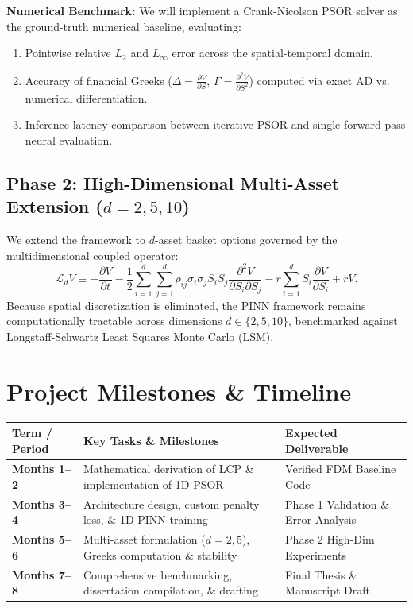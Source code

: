 ﻿\documentclass[10.5pt,a4paper]{article}
\begin{document}
\noindent \textbf{Numerical Benchmark:} We will implement a Crank-Nicolson PSOR solver as the ground-truth numerical baseline, evaluating:
\begin{enumerate}[label=(\roman*), itemsep=0.02em, topsep=0.05em]
    \item Pointwise relative $L_2$ and $L_\infty$ error across the spatial-temporal domain.
    \item Accuracy of financial Greeks ($\Delta = \frac{\partial V}{\partial S}, \, \Gamma = \frac{\partial^2 V}{\partial S^2}$) computed via exact AD vs. numerical differentiation.
    \item Inference latency comparison between iterative PSOR and single forward-pass neural evaluation.
\end{enumerate}

\subsection{Phase 2: High-Dimensional Multi-Asset Extension (\texorpdfstring{$d = 2, 5, 10$}{d = 2, 5, 10})}
We extend the framework to $d$-asset basket options governed by the multidimensional coupled operator:
\begin{equation}
\mathcal{L}_d V \equiv -\frac{\partial V}{\partial t} - \frac{1}{2}\sum_{i=1}^d \sum_{j=1}^d \rho_{ij}\sigma_i \sigma_j S_i S_j \frac{\partial^2 V}{\partial S_i \partial S_j} - r\sum_{i=1}^d S_i \frac{\partial V}{\partial S_i} + rV.
\end{equation}
Because spatial discretization is eliminated, the PINN framework remains computationally tractable across dimensions $d \in \{2, 5, 10\}$, benchmarked against Longstaff-Schwartz Least Squares Monte Carlo (LSM).

\vspace{-0.3em}
\section{Project Milestones \& Timeline}
\vspace{-0.2em}
\begin{table}[h!]
\centering
\footnotesize
\begin{tabularx}{\textwidth}{@{}l X l@{}}
\toprule
\textbf{Term / Period} & \textbf{Key Tasks \& Milestones} & \textbf{Expected Deliverable} \\ \midrule
\textbf{Months 1--2} & Mathematical derivation of LCP \& implementation of 1D PSOR & Verified FDM Baseline Code \\
\textbf{Months 3--4} & Architecture design, custom penalty loss, \& 1D PINN training & Phase 1 Validation \& Error Analysis \\
\textbf{Months 5--6} & Multi-asset formulation ($d=2, 5$), Greeks computation \& stability & Phase 2 High-Dim Experiments \\
\textbf{Months 7--8} & Comprehensive benchmarking, dissertation compilation, \& drafting & Final Thesis \& Manuscript Draft \\ \bottomrule
\end{tabularx}
\end{table}
\end{document}
